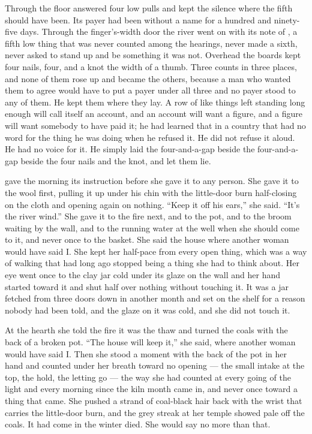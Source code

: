 Through the floor  answered four low pulls and kept the silence where the fifth should have been. Its payer had been without a name for a hundred and ninety-five days. Through the finger's-width door the river went on with its note of , a fifth low thing that was never counted among the hearings, never made a sixth, never asked to stand up and be something it was not. Overhead the boards kept four nails, four, and a knot the width of a thumb. Three counts in three places, and none of them rose up and became the others, because a man who wanted them to agree would have to put a payer under all three and no payer stood to any of them. He kept them where they lay. A row of like things left standing long enough will call itself an account, and an account will want a figure, and a figure will want somebody to have paid it; he had learned that in a country that had no word for the thing he was doing when he refused it. He did not refuse it aloud. He had no voice for it. He simply laid the four-and-a-gap beside the four-and-a-gap beside the four nails and the knot, and let them lie.

 gave the morning its instruction before she gave it to any person. She gave it to the wool first, pulling it up under his chin with the little-door burn half-closing on the cloth and opening again on nothing. “Keep it off his ears,” she said. “It's the river wind.” She gave it to the fire next, and to the pot, and to the broom waiting by the wall, and to the running water at the well when she should come to it, and never once to the basket. She said the house where another woman would have said I. She kept her half-pace from every open thing, which was a way of walking that had long ago stopped being a thing she had to think about. Her eye went once to the clay jar cold under its glaze on the wall and her hand started toward it and shut half over nothing without touching it. It was a jar fetched from three doors down in another month and set on the shelf for a reason nobody had been told, and the glaze on it was cold, and she did not touch it.

At the hearth she told the fire it was the thaw and turned the coals with the back of a broken pot. “The house will keep it,” she said, where another woman would have said I. Then she stood a moment with the back of the pot in her hand and counted under her breath toward no opening --- the small intake at the top, the hold, the letting go --- the way she had counted at every going of the light and every morning since the kiln month came in, and never once toward a thing that came. She pushed a strand of coal-black hair back with the wrist that carries the little-door burn, and the grey streak at her temple showed pale off the coals. It had come in the winter  died. She would say no more than that.

